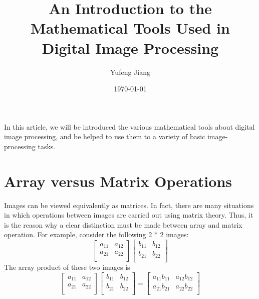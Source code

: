 \documentclass[a4paper,11pt]{article}
\title{An Introduction to the Mathematical Tools Used in Digital Image Processing}
\author{Yufeng Jiang}
\date{\today}
\begin{document}
\maketitle
In this article, we will be introduced the various mathematical tools about digital image processing, and be helped to use them to a variety of basic image-processing tasks.\\
\section{Array versus Matrix Operations}
\indent Images can be viewed equivalently as matrices. In fact, there are many situations
in which operations between images are carried out using matrix theory. Thus, it is the reason why a clear distinction must be made between array and matrix operation. For example, consider the following 2 * 2 images:\\
$$
\left[
\begin{matrix}
  a_{11} & a_{12} \\
  a_{21} & a_{22} \\
  \end{matrix} 
  \right]
  \left[
  \begin{matrix}
  b_{11} & b_{12} \\
  b_{21} & b_{22} \\
  \end{matrix}
  \right]
$$
\indent The array product of these two images is
$$
\left[ 
\begin{matrix}
  a_{11} & a_{12} \\
  a_{21} & a_{22} \\
  \end{matrix}
  \right]  
  \left[ 
  \begin{matrix}
  b_{11} & b_{12} \\
  b_{21} & b_{22} \\
  \end{matrix}
  \right]  =
  \left[
  \begin{matrix}
  a_{11}b_{11} & a_{12}b_{12} \\
  a_{21}b_{21} & a_{22}b_{22} \\
  \end{matrix}
    \right]
 $$
\end{document}
